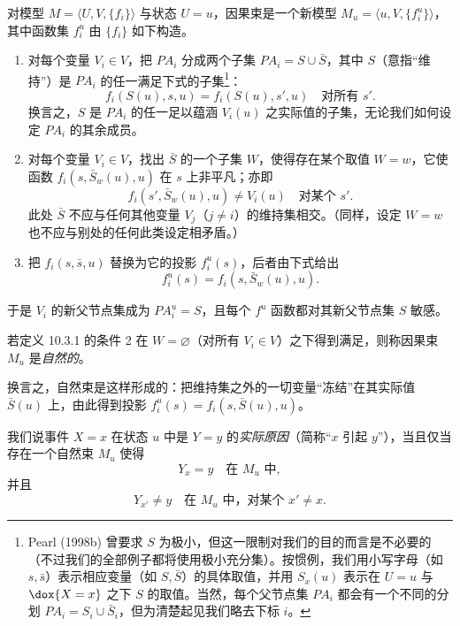 \begin{definition}[因果束]
对模型 $M=\langle U,V,\{f_i\}\rangle$ 与状态 $U=u$，因果束是一个新模型 $M_u=\langle u,V,\{f_i^u\}\rangle$，其中函数集 $f_i^u$ 由 $\{f_i\}$ 如下构造。
\begin{enumerate}[label=\arabic*.,leftmargin=1.9em]
\item 对每个变量 $V_i\in V$，把 $PA_i$ 分成两个子集 $PA_i=S\cup\bar S$，其中 $S$（意指“维持”）是 $PA_i$ 的任一满足下式的子集\footnote{Pearl (1998b) 曾要求 $S$ 为极小，但这一限制对我们的目的而言是不必要的（不过我们的全部例子都将使用极小充分集）。按惯例，我们用小写字母（如 $s,\bar s$）表示相应变量（如 $S,\bar S$）的具体取值，并用 $S_x(u)$ 表示在 $U=u$ 与 $\dox{X=x}$ 之下 $S$ 的取值。当然，每个父节点集 $PA_i$ 都会有一个不同的分划 $PA_i=S_i\cup\bar S_i$，但为清楚起见我们略去下标 $i$。}：
\begin{equation}
f_i(S(u),s,u)=f_i(S(u),s',u)\quad\text{对所有 } s'.\tag{10.6}
\end{equation}
换言之，$S$ 是 $PA_i$ 的任一足以蕴涵 $V_i(u)$ 之实际值的子集，无论我们如何设定 $PA_i$ 的其余成员。
\item 对每个变量 $V_i\in V$，找出 $\bar S$ 的一个子集 $W$，使得存在某个取值 $W=w$，它使函数 $f_i(s,\bar S_w(u),u)$ 在 $s$ 上非平凡；亦即
\[
f_i(s',\bar S_w(u),u)\neq V_i(u)\quad\text{对某个 } s'.
\]
此处 $\bar S$ 不应与任何其他变量 $V_j$（$j\neq i$）的维持集相交。（同样，设定 $W=w$ 也不应与别处的任何此类设定相矛盾。）
\item 把 $f_i(s,\bar s,u)$ 替换为它的投影 $f_i^u(s)$，后者由下式给出
\begin{equation}
f_i^u(s)=f_i(s,\bar S_w(u),u).\tag{10.7}
\end{equation}
\end{enumerate}
于是 $V_i$ 的新父节点集成为 $PA_i^u=S$，且每个 $f^u$ 函数都对其新父节点集 $S$ 敏感。
\end{definition}

\begin{definition}[自然束]
若定义 10.3.1 的条件 2 在 $W=\varnothing$（对所有 $V_i\in V$）之下得到满足，则称因果束 $M_u$ 是\emph{自然的}。
\end{definition}

换言之，自然束是这样形成的：把维持集之外的一切变量“冻结”在其实际值 $\bar S(u)$ 上，由此得到投影 $f_i^u(s)=f_i(s,\bar S(u),u)$。

\begin{definition}[实际原因]
我们说事件 $X=x$ 在状态 $u$ 中是 $Y=y$ 的\emph{实际原因}（简称“$x$ 引起 $y$”），当且仅当存在一个自然束 $M_u$ 使得
\begin{equation}
Y_x=y\quad\text{在 } M_u \text{ 中},\tag{10.8}
\end{equation}
并且
\begin{equation}
Y_{x'}\neq y\quad\text{在 } M_u \text{ 中，对某个 } x'\neq x.\tag{10.9}
\end{equation}
\end{definition}

